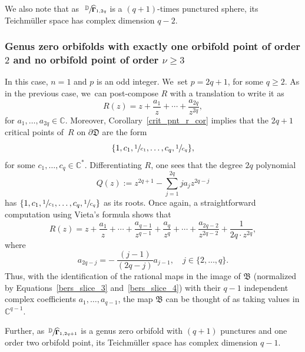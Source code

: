 \documentclass[JEP,XML,SOM,Unicode,NoFloatCountersInSection,published]{cedram}
\let\faktor\sfrac
\theoremstyle{definition}
\theoremstyle{remark}
\newcommand{\C}{\mathbb{C}}
\newcommand{\D}{\mathbb{D}}
\begin{document}
We also note that as $\ \faktor{\D}{\widehat{\pmb{\Gamma}}_{1,2q}}$ is a $(q+1)$-times punctured sphere, its Teichmüller space has complex dimension $q-2$.

\subsubsection*{Genus zero orbifolds with exactly one orbifold point of order $2$ and no orbifold point of order $\nu\geq 3$}
In this case, $n=1$ and $p$ is an odd integer. We~set $p=2q+1$, for some $q\geq 2$.
As in the previous case, we~can post-compose $R$ with a translation to write it as
\[
R(z)=z+\frac{a_1}{z}+\cdots+\frac{a_{2q}}{z^{2q}},
\]
for $a_1,\dots,a_{2q}\in\C$. Moreover, Corollary~\ref{crit_pnt_r_cor} implies that the $2q+1$ critical points of~$R$ on $\partial\mathfrak{D}$ are the form
\[
\{1, c_1,\sfrac{1}{c_1},\dots, c_{q},\sfrac{1}{c_{q}}\},
\]
for some $c_1,\dots,c_{q}\in\C^*$.
Differentiating $R$, one sees that the degree $2q$ polynomial
\[
Q(z):= z^{2q+1}-\sum_{j=1}^{2q} j a_j z^{2q-j}
\]
has $\{1, c_1,\sfrac{1}{c_1},\dots, c_{q},\sfrac{1}{c_{q}}\}$ as its roots.
Once again, a straightforward computation using Vieta's formula shows that
\begin{equation}
R(z)=z+\frac{a_1}{z}+\cdots+\frac{a_{q-1}}{z^{q-1}}+\frac{a_q}{z^q}+\cdots+\frac{a_{2q-2}}{z^{2q-2}}+\frac{1}{2q\cdot z^{2q}},
\label{bers_slice_3}
\end{equation}
where
\begin{equation}
a_{2q-j}= -\ \frac{(j-1)}{(2q-j)} a_{j-1},\quad j\in\{2,\dots,q\}.
\label{bers_slice_4}
\end{equation}
Thus, with the identification of the rational maps in the image of $\mathfrak{B}$ (normalized by Equations~\eqref{bers_slice_3} and~\eqref{bers_slice_4}) with their $q-1$ independent complex coefficients $a_1,\dots,a_{q-1}$, the map $\mathfrak{B}$ can be thought of as taking values in $\C^{q-1}$.

Further, as~$\faktor{\D}{\widehat{\pmb{\Gamma}}_{1,2q+1}}$ is a genus zero orbifold with $(q+1)$ punctures and one order two orbifold point, its Teichmüller space has complex dimension $q-1$.
\end{document}
